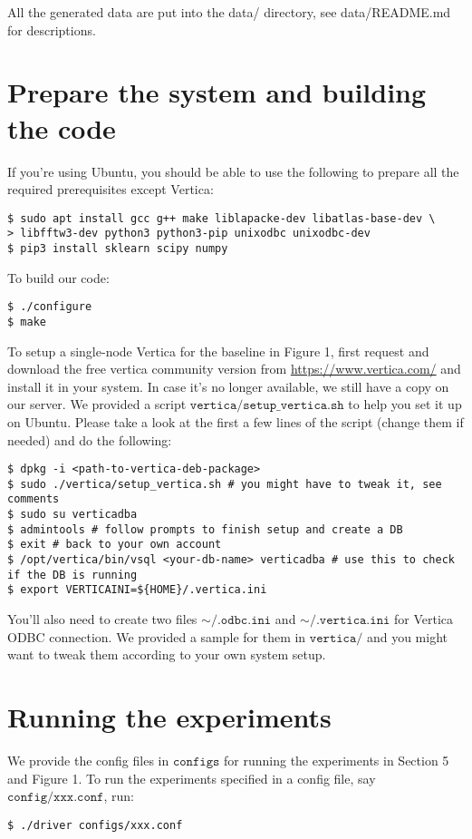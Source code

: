 \documentclass[11pt]{article}
\begin{document}
All the generated data are put into the data/ directory, see
data/README.md for descriptions.

\section{Prepare the system and building the code}
If you're using Ubuntu, you should be able to use the following to
prepare all the required prerequisites except Vertica:
\begin{verbatim}
$ sudo apt install gcc g++ make liblapacke-dev libatlas-base-dev \
> libfftw3-dev python3 python3-pip unixodbc unixodbc-dev
$ pip3 install sklearn scipy numpy
\end{verbatim}

To build our code:
\begin{verbatim}
$ ./configure
$ make
\end{verbatim}

To setup a single-node Vertica for the baseline in Figure 1, first
request and download the free vertica community version from
\url{https://www.vertica.com/} and install it in your system. In case
it's no longer available, we still have a copy on our server. We
provided a script $\texttt{vertica/setup\_vertica.sh}$ to help you set
it up on Ubuntu. Please take a look at the first a few lines of the
script (change them if needed) and do the following:
\begin{verbatim}
$ dpkg -i <path-to-vertica-deb-package>
$ sudo ./vertica/setup_vertica.sh # you might have to tweak it, see comments
$ sudo su verticadba
$ admintools # follow prompts to finish setup and create a DB
$ exit # back to your own account
$ /opt/vertica/bin/vsql <your-db-name> verticadba # use this to check if the DB is running
$ export VERTICAINI=${HOME}/.vertica.ini
\end{verbatim}
You'll also need to create two files $\mathtt{\sim/.odbc.ini}$ and
$\mathtt{\sim/.vertica.ini}$ for Vertica ODBC connection. We provided
a sample for them in $\texttt{vertica/}$ and you might want to tweak
them according to your own system setup.


\section{Running the experiments}


We provide the config files in $\texttt{configs}$ for running the
experiments in Section 5 and Figure 1. To run the experiments
specified in a config file, say $\texttt{config/xxx.conf}$, run:
\begin{verbatim}
$ ./driver configs/xxx.conf
\end{verbatim}
\end{document}
